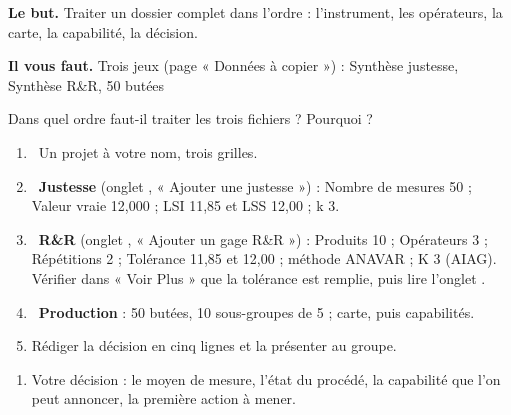 \documentclass[10pt,a4paper]{article}
\begin{document}
\thispagestyle{fancy}
\begin{tcolorbox}[boite]\textbf{Le but.} Traiter un dossier complet dans l'ordre : l'instrument, les opérateurs, la carte, la capabilité, la décision.\par\textbf{Il vous faut.} Trois jeux (page « Données à copier ») : Synthèse justesse, Synthèse R\&R, 50 butées\end{tcolorbox}
\begin{tcolorbox}[pred]Dans quel ordre faut-il traiter les trois fichiers ? Pourquoi ?\reponse\end{tcolorbox}
\begin{enumerate}[label=\textcolor{cyan}{\textbf{\arabic*.}},leftmargin=15pt,itemsep=1.5pt]
\item \tagE\ Un projet à votre nom, trois grilles.
\item \tagE\ \textbf{Justesse} (onglet , « Ajouter une justesse ») : Nombre de mesures 50 ; Valeur vraie 12,000 ; LSI 11,85 et LSS 12,00 ; k 3.
\item \tagE\ \textbf{R\&R} (onglet , « Ajouter un gage R\&R ») : Produits 10 ; Opérateurs 3 ; Répétitions 2 ; Tolérance 11,85 et 12,00 ; méthode ANAVAR ; K 3 (AIAG). Vérifier dans « Voir Plus » que la tolérance est remplie, puis lire l'onglet .
\item \tagE\ \textbf{Production} : 50 butées, 10 sous-groupes de 5 ; carte, puis capabilités.
\item Rédiger la décision en cinq lignes et la présenter au groupe.
\end{enumerate}
\par
{}
\begin{enumerate}[label=\textcolor{cyan}{\textbf{Q\arabic*.}},leftmargin=22pt]
\item Votre décision : le moyen de mesure, l'état du procédé, la capabilité que l'on peut annoncer, la première action à mener.\reponse[5]
\end{enumerate}
\end{document}
